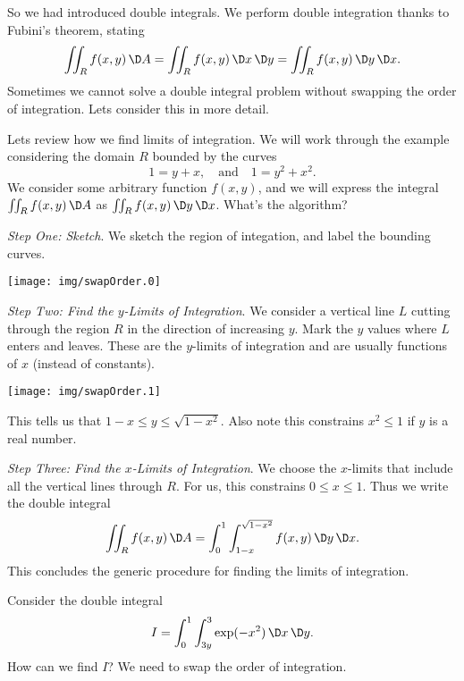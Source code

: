 \M
So we had introduced double integrals. We perform double
integration thanks to Fubini's theorem, stating
\begin{equation}
\iint_{R}f(x,y)\,\D A
=\iint_{R}f(x,y)\,\D x\,\D y
=\iint_{R}f(x,y)\,\D y\,\D x.
\end{equation}
Sometimes we cannot solve a double integral problem without
swapping the order of integration. Lets consider this in more
detail.\more

Lets review how we find limits of integration. We will work
through the example considering the domain $R$ bounded by the
curves
\begin{equation}
1=y+x,\quad\mbox{and}\quad 1=y^{2}+x^{2}.
\end{equation}
We consider some arbitrary function $f(x,y)$, and we will express
the integral $\iint_{R}f(x,y)\,\D A$ as $\iint_{R}f(x,y)\,\D
y\,\D x$. What's the algorithm?

\emph{Step One: Sketch}. We sketch the region of integation, and
label the bounding curves.
\begin{center}
  \texttt{[image: img/swapOrder.0]}
\end{center}

\emph{Step Two: Find the $y$-Limits of Integration}. We consider
a vertical line $L$ cutting through the region $R$ in the
direction of increasing $y$. Mark the $y$ values where $L$ enters
and leaves. These are the $y$-limits of integration and are
usually functions of $x$ (instead of constants).
\begin{center}
  \texttt{[image: img/swapOrder.1]}
\end{center}
This tells us that $1-x\leq y\leq\sqrt{1-x^{2}}$. Also note this
constrains $x^{2}\leq 1$ if $y$ is a real number.

\emph{Step Three: Find the $x$-Limits of Integration}. We choose
the $x$-limits that include all the vertical lines through
$R$. For us, this constrains $0\leq x\leq 1$. Thus we write the
double integral 
\begin{equation}
\iint_{R}f(x,y)\,\D
A=\int^{1}_{0}\int^{\sqrt{1-x^{2}}}_{1-x}f(x,y)\,\D y\,\D x.
\end{equation}
This concludes the generic procedure for finding the limits of
integration. 

 Consider the double integral
\begin{equation}
I=\int^{1}_{0}\int^{3}_{3y}\exp(-x^{2})\,\D x\,\D y.
\end{equation}
How can we find $I$? We need to swap the order of integration. 

